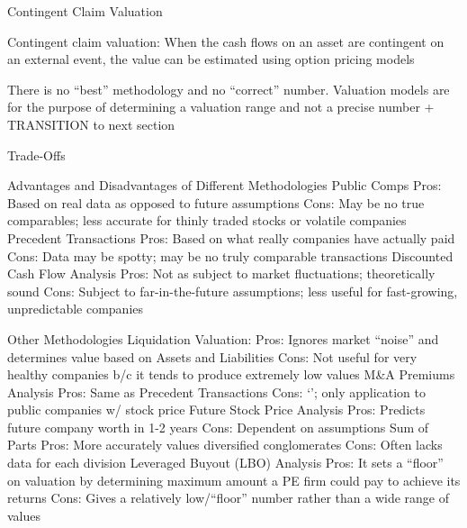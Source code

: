 \documentclass[10pt]{article}
\begin{document}
    \begin{core}{Contingent Claim Valuation}

      Contingent claim valuation: When the cash flows on an asset are contingent on an external event, the value can be estimated using option pricing models

    \end{core}

    There is no “best” methodology and no “correct” number. Valuation models are for the purpose of determining a valuation range and not a precise number + TRANSITION to next section

    \begin{core}{Trade-Offs}

      Advantages and Disadvantages of Different Methodologies
        Public Comps
          Pros: Based on real data as opposed to future assumptions
          Cons: May be no true comparables; less accurate for thinly traded stocks or volatile companies
        Precedent Transactions
          Pros: Based on what really companies have actually paid
          Cons: Data may be spotty; may be no truly comparable transactions
        Discounted Cash Flow Analysis
          Pros: Not as subject to market fluctuations; theoretically sound
          Cons: Subject to far-in-the-future assumptions; less useful for fast-growing, unpredictable companies

      Other Methodologies
        Liquidation Valuation:
          Pros: Ignores market “noise” and determines value based on Assets and Liabilities
          Cons: Not useful for very healthy companies b/c it tends to produce extremely low values
        M&A Premiums Analysis
          Pros: Same as Precedent Transactions
          Cons: ‘’; only application to public companies w/ stock price
        Future Stock Price Analysis
          Pros: Predicts future company worth in 1-2 years
          Cons: Dependent on assumptions
        Sum of Parts
          Pros: More accurately values diversified conglomerates
          Cons: Often lacks data for each division
        Leveraged Buyout (LBO) Analysis
          Pros: It sets a “floor” on valuation by determining maximum amount a PE firm could pay to achieve its returns
          Cons: Gives a relatively low/“floor” number rather than a wide range of values

    \end{core}
\end{document}
